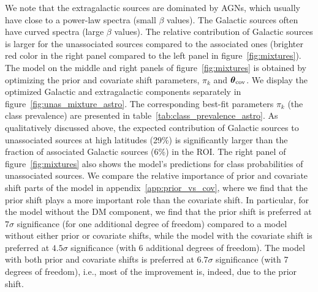 \documentclass[12pt, a4paper]{article}
\newcommand{\btheta}{\boldsymbol{\theta}}
\begin{document}
We note that the extragalactic sources are dominated by AGNs, which usually have close to a power-law spectra (small $\beta$ values).
The Galactic sources often have curved spectra (large $\beta$ values).
The relative contribution of Galactic sources is larger for the unassociated sources compared to the associated ones (brighter red color in the right panel compared to the left panel in figure~\ref{fig:mixtures}).
The model on the middle and right panels of figure~\ref{fig:mixtures} is obtained by optimizing the prior and covariate shift parameters, $\pi_k$ and $\btheta_{\rm cov}$.
We display the optimized Galactic and extragalactic components separately in figure~\ref{fig:unas_mixture_astro}.
The corresponding best-fit parameters $\pi_k$ (the class prevalence) are presented in table~\ref{tab:class_prevalence_astro}. 
As qualitatively discussed above, the expected contribution of Galactic sources to unassociated sources at high latitudes (29\%) is significantly larger than the fraction of associated Galactic sources (6\%) in the ROI.
The right panel of figure~\ref{fig:mixtures} also shows the model's predictions for class probabilities of unassociated sources. 
{
We compare the relative importance of prior and covariate shift parts of the model in appendix~\ref{app:prior_vs_cov}, where
we find that the prior shift plays a more important role than the covariate shift.
In particular, for the model without the DM component, we find that the prior shift is preferred at $7\sigma$ significance (for one additional degree of freedom) compared to a model without either prior or covariate shifts, while the model with the covariate shift is preferred at $4.5\sigma$ significance (with 6 additional degrees of freedom). The model with both prior and covariate shifts is preferred at $6.7\sigma$ significance (with 7 degrees of freedom), i.e., most of the improvement is, indeed, due to the prior shift.
}
\end{document}
